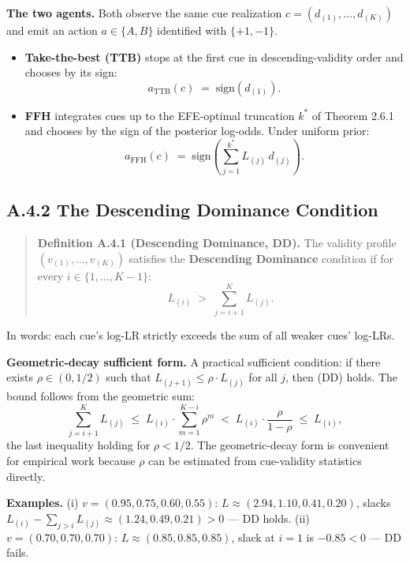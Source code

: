 \documentclass{article}
\begin{document}
\textbf{The two agents.} Both observe the same cue realization
\(c = (d_{(1)}, \ldots, d_{(K)})\) and emit an action \(a \in \{A, B\}\)
identified with \(\{+1, -1\}\).

\begin{itemize}
\item
  \textbf{Take-the-best (TTB)} stops at the first cue in
  descending-validity order and chooses by its sign: \[
  a_{\mathrm{TTB}}(c) \;=\; \mathrm{sign}(d_{(1)}).
  \]
\item
  \textbf{FFH} integrates cues up to the EFE-optimal truncation
  \(k^{*}\) of Theorem 2.6.1 and chooses by the sign of the posterior
  log-odds. Under uniform prior: \[
  a_{\mathrm{FFH}}(c) \;=\; \mathrm{sign}\!\left( \sum_{j=1}^{k^{*}} L_{(j)}\, d_{(j)} \right).
  \]
\end{itemize}

\subsection{A.4.2 The Descending Dominance
Condition}\label{a.4.2-the-descending-dominance-condition}

\begin{quote}
\textbf{Definition A.4.1 (Descending Dominance, DD).} The validity
profile \((v_{(1)}, \ldots, v_{(K)})\) satisfies the \textbf{Descending
Dominance} condition if for every \(i \in \{1, \ldots, K-1\}\): \[
L_{(i)} \;>\; \sum_{j=i+1}^{K} L_{(j)}. \tag{DD}
\]
\end{quote}

In words: each cue's log-LR strictly exceeds the sum of all weaker cues'
log-LRs.

\textbf{Geometric-decay sufficient form.} A practical sufficient
condition: if there exists \(\rho \in (0, 1/2)\) such that
\(L_{(j+1)} \leq \rho \cdot L_{(j)}\) for all \(j\), then (DD) holds.
The bound follows from the geometric sum: \[
\sum_{j=i+1}^{K} L_{(j)} \;\leq\; L_{(i)} \cdot \sum_{m=1}^{K-i} \rho^{m} \;<\; L_{(i)} \cdot \frac{\rho}{1 - \rho} \;\leq\; L_{(i)},
\] the last inequality holding for \(\rho < 1/2\). The geometric-decay
form is convenient for empirical work because \(\rho\) can be estimated
from cue-validity statistics directly.

\textbf{Examples.} (i) \(v = (0.95, 0.75, 0.60, 0.55)\):
\(L \approx (2.94, 1.10, 0.41, 0.20)\), slacks
\(L_{(i)} - \sum_{j>i} L_{(j)} \approx (1.24, 0.49, 0.21) > 0\) --- DD
holds. (ii) \(v = (0.70, 0.70, 0.70)\):
\(L \approx (0.85, 0.85, 0.85)\), slack at \(i=1\) is \(-0.85 < 0\) ---
DD fails.
\end{document}

